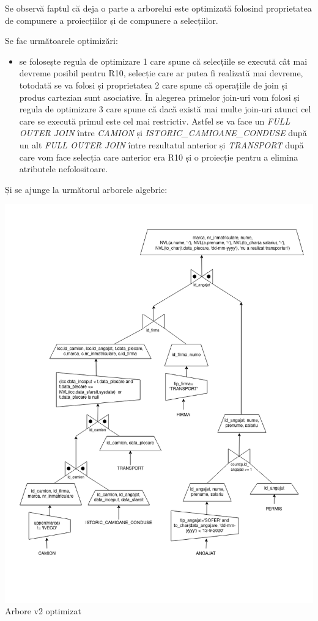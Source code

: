 \documentclass[12pt, a4paper]{article}
\begin{document}
Se observă faptul că deja o parte a arborelui este optimizată folosind proprietatea de compunere a proiecțiilor și de compunere a selecțiilor.

Se fac următoarele optimizări:

\begin{itemize}
    \item se folosește regula de optimizare 1 care spune că selecțiile se execută cât mai devreme posibil pentru R10, selecție care ar putea fi realizată mai devreme, totodată se va folosi și proprietatea 2 care spune că operațiile de join și produs cartezian sunt asociative. În alegerea primelor join-uri vom folosi și regula de optimizare 3 care spune că dacă există mai multe join-uri atunci cel care se execută primul este cel mai restrictiv. Astfel se va face un \emph{FULL OUTER JOIN} între \emph{CAMION} și \emph{ISTORIC\_CAMIOANE\_CONDUSE} după un alt \emph{FULL OUTER JOIN} între rezultatul anterior și \emph{TRANSPORT} după care vom face selecția care anterior era R10 și o proiecție pentru a elimina atributele nefolositoare.
\end{itemize}

\newpage
Și se ajunge la următorul arborele algebric:

\includegraphics[width=\textwidth]{arbore_v2.png}
\label{arbore_v2}
\centering Arbore v2 optimizat
\end{document}
